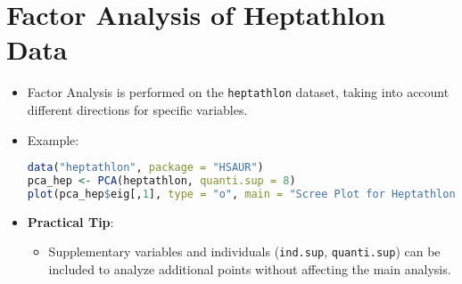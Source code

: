 \documentclass{article}
\begin{document}
\section{Factor Analysis of Heptathlon Data}
\begin{itemize}
    \item Factor Analysis is performed on the \texttt{heptathlon} dataset, taking into account different directions for specific variables.
    \item Example:
\begin{lstlisting}[language=R, breaklines=true]
data("heptathlon", package = "HSAUR")
pca_hep <- PCA(heptathlon, quanti.sup = 8)
plot(pca_hep$eig[,1], type = "o", main = "Scree Plot for Heptathlon Data")
\end{lstlisting}
\item \textbf{Practical Tip}:
    \begin{itemize}
        \item Supplementary variables and individuals (\texttt{ind.sup}, \texttt{quanti.sup}) can be included to analyze additional points without affecting the main analysis.
    \end{itemize}
\end{itemize}
\end{document}
